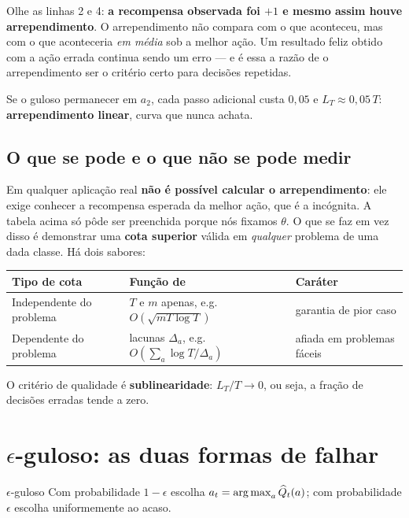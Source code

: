 \documentclass[11pt, a4paper]{article}
\newcommand{\Qhat}{\widehat{Q}}
\newcommand{\gap}{\Delta}
\newcommand{\Reg}{L}
\begin{document}
\begin{alertabox}
Olhe as linhas 2 e 4: \textbf{a recompensa observada foi $+1$ e mesmo assim
houve arrependimento}. O arrependimento não compara com o que aconteceu, mas
com o que aconteceria \emph{em média} sob a melhor ação. Um resultado feliz
obtido com a ação errada continua sendo um erro — e é essa a razão de o
arrependimento ser o critério certo para decisões repetidas.
\end{alertabox}

Se o guloso permanecer em $a_2$, cada passo adicional custa $0{,}05$ e
$\Reg_T \approx 0{,}05\,T$: \textbf{arrependimento linear}, curva que nunca
achata.

\subsection*{O que se pode e o que não se pode medir}

Em qualquer aplicação real \textbf{não é possível calcular o
arrependimento}: ele exige conhecer a recompensa esperada da melhor ação,
que é a incógnita. A tabela acima só pôde ser preenchida porque nós fixamos
$\theta$. O que se faz em vez disso é demonstrar uma \textbf{cota superior}
válida em \emph{qualquer} problema de uma dada classe. Há dois sabores:

\begin{center}
\begin{tabular}{lll}
\toprule
\textbf{Tipo de cota} & \textbf{Função de} & \textbf{Caráter} \\
\midrule
Independente do problema & $T$ e $m$ apenas, e.g.\ $O(\sqrt{mT\log T})$
  & garantia de pior caso \\
Dependente do problema & lacunas $\gap_a$, e.g.\ $O(\sum_a \log T/\gap_a)$
  & afiada em problemas fáceis \\
\bottomrule
\end{tabular}
\end{center}

O critério de qualidade é \textbf{sublinearidade}: $\Reg_T/T \to 0$, ou
seja, a fração de decisões erradas tende a zero.

\section{$\epsilon$-guloso: as duas formas de falhar}

\begin{algbox}{$\epsilon$-guloso}
Com probabilidade $1 - \epsilon$ escolha
$a_t = \argmax_a \Qhat_t(a)$; com probabilidade $\epsilon$ escolha
uniformemente ao acaso.
\end{algbox}
\end{document}
